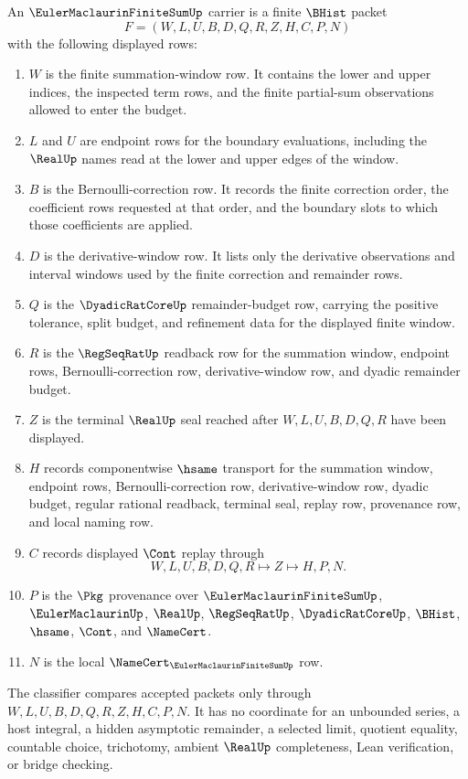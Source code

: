 \begin{definition}
\label{def:euler-maclaurin-finite-sum-carrier}
An $\EulerMaclaurinFiniteSumUp$ carrier is a finite $\BHist$ packet
$$
F=(W,L,U,B,D,Q,R,Z,H,C,P,N)
$$
with the following displayed rows:
\begin{enumerate}
\item $W$ is the finite summation-window row. It contains the lower and upper indices, the inspected term rows, and the finite partial-sum observations allowed to enter the budget.
\item $L$ and $U$ are endpoint rows for the boundary evaluations, including the $\RealUp$ names read at the lower and upper edges of the window.
\item $B$ is the Bernoulli-correction row. It records the finite correction order, the coefficient rows requested at that order, and the boundary slots to which those coefficients are applied.
\item $D$ is the derivative-window row. It lists only the derivative observations and interval windows used by the finite correction and remainder rows.
\item $Q$ is the $\DyadicRatCoreUp$ remainder-budget row, carrying the positive tolerance, split budget, and refinement data for the displayed finite window.
\item $R$ is the $\RegSeqRatUp$ readback row for the summation window, endpoint rows, Bernoulli-correction row, derivative-window row, and dyadic remainder budget.
\item $Z$ is the terminal $\RealUp$ seal reached after $W,L,U,B,D,Q,R$ have been displayed.
\item $H$ records componentwise $\hsame$ transport for the summation window, endpoint rows, Bernoulli-correction row, derivative-window row, dyadic budget, regular rational readback, terminal seal, replay row, provenance row, and local naming row.
\item $C$ records displayed $\Cont$ replay through
$$
W,L,U,B,D,Q,R \longmapsto Z \longmapsto H,P,N .
$$
\item $P$ is the $\Pkg$ provenance over $\EulerMaclaurinFiniteSumUp$, $\EulerMaclaurinUp$, $\RealUp$, $\RegSeqRatUp$, $\DyadicRatCoreUp$, $\BHist$, $\hsame$, $\Cont$, and $\NameCert$.
\item $N$ is the local $\NameCert_{\EulerMaclaurinFiniteSumUp}$ row.
\end{enumerate}
The classifier compares accepted packets only through $W,L,U,B,D,Q,R,Z,H,C,P,N$. It has no coordinate for an unbounded series, a host integral, a hidden asymptotic remainder, a selected limit, quotient equality, countable choice, trichotomy, ambient $\RealUp$ completeness, Lean verification, or bridge checking.
\end{definition}


